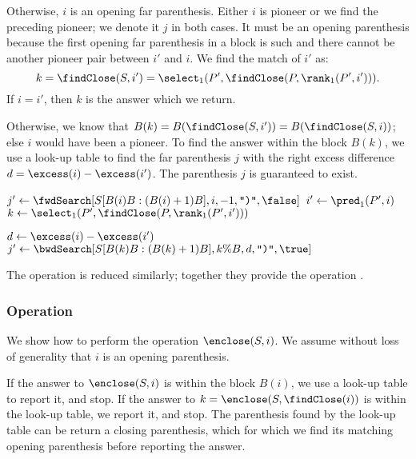 Otherwise, $i$ is an opening far parenthesis.
Either $i$ is pioneer or we find the preceding pioneer; we denote it $j$ in both cases.
It must be an opening parenthesis because the first opening far parenthesis in a block is such and there cannot be another pioneer pair between $i'$ and $i$.
We find the match of $i'$ as:
$$ k = \findClose(S, i') = \select_1(P', \findClose(P, \rank_1(P', i'))). $$
If $i = i'$, then $k$ is the answer which we return.

Otherwise, we know that $B(k) = B(\findClose(S, i')) = B(\findClose(S, i))$; else $i$ would have been a pioneer.
To find the answer within the block $B(k)$, we use a look-up table \bwdSearch{} to find the far parenthesis $j$ with the right excess difference $d = \excess(i) - \excess(i')$.
The parenthesis $j$ is guaranteed to exist.

\begin{algorithm}
\begin{algorithmic}
		\State {}
	\Else
		\State $j' \gets \fwdSearch[S[B(i)B: (B(i) + 1)B], i, -1, \closingParen, \false]$
			\State {} 
		\Else
			\State $i' \gets \pred_1(P', i)$
			\State $k \gets \select_1(P', \findClose(P, \rank_1(P', i')))$ 

			\State $d \gets \excess(i) - \excess(i')$
			\State $j' \gets \bwdSearch[S[B(k)B: (B(k) + 1)B], k \% B, d, \closingParen, \true]$
			\State {}
		\EndIf
	\EndIf
\EndFunction
\end{algorithmic}
\end{algorithm}

The operation \findOpen{} is reduced similarly; together they provide the operation \match{}.

\subsubsection{Operation \enclose}

We show how to perform the operation $\enclose(S, i)$.
We assume without loss of generality that $i$ is an opening parenthesis.

If the answer to $\enclose(S, i)$ is within the block $B(i)$, we use a look-up table to report it, and stop.
If the answer to $k = \enclose(S, \findClose(i))$ is within the look-up table, we report it, and stop.
The parenthesis found by the look-up table can be return a closing parenthesis, which for which we find its matching opening parenthesis before reporting the answer.

